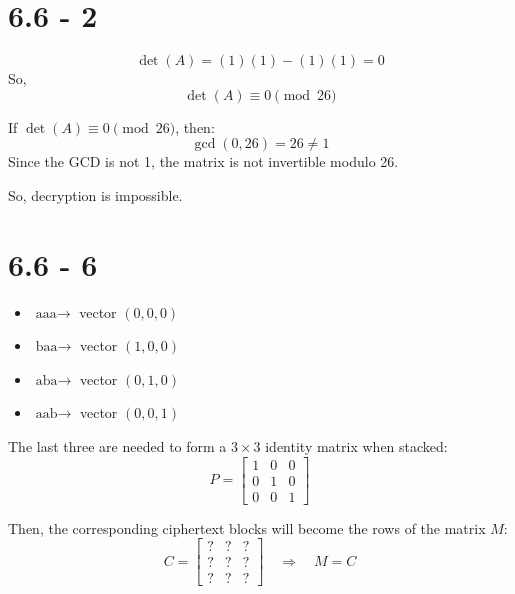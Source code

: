 \documentclass[12pt]{article}
\begin{document}
\newpage

\section*{6.6 - 2}


\[
\det(A) = (1)(1) - (1)(1) = 0
\]
So,
\[
\det(A) \equiv 0 \pmod{26}
\]

If \( \det(A) \equiv 0 \pmod{26} \), then:
\[
\gcd(0, 26) = 26 \neq 1
\]
Since the GCD is not 1, the matrix is not invertible modulo 26.

So, decryption is impossible.




\newpage

\section*{6.6 - 6}


\begin{itemize}
    \item \( \text{aaa} \rightarrow \) vector \( (0, 0, 0) \)
    \item \( \text{baa} \rightarrow \) vector \( (1, 0, 0) \)
    \item \( \text{aba} \rightarrow \) vector \( (0, 1, 0) \)
    \item \( \text{aab} \rightarrow \) vector \( (0, 0, 1) \)
\end{itemize}

The last three are needed to form a \( 3 \times 3 \) identity matrix when stacked:
\[
P = \begin{bmatrix}
1 & 0 & 0 \\
0 & 1 & 0 \\
0 & 0 & 1
\end{bmatrix}
\]

Then, the corresponding ciphertext blocks will become the rows of the matrix \( M \):
\[
C = \begin{bmatrix}
? & ? & ? \\
? & ? & ? \\
? & ? & ?
\end{bmatrix}
\quad \Rightarrow \quad M = C
\]
\end{document}
